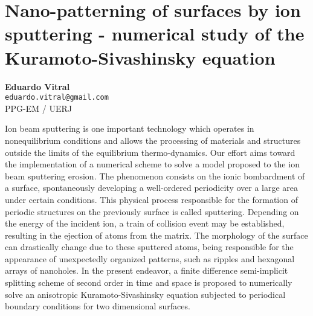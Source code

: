 
\section{Nano-patterning of surfaces by ion sputtering - numerical study of the Kuramoto-Sivashinsky equation}

\textbf{Eduardo Vitral}\\
\texttt{\small{eduardo.vitral@gmail.com}}\\
PPG-EM / UERJ

Ion beam sputtering is one important technology which operates in nonequilibrium conditions and allows the processing of materials and structures outside the limits of the equilibrium thermo-dynamics. Our effort aims toward the implementation of a numerical scheme to solve a model proposed to the ion beam sputtering erosion. The phenomenon consists on the ionic bombardment of a surface, spontaneously developing a well-ordered periodicity over a large area under certain conditions. This physical process responsible for the formation of periodic structures on the previously surface is called sputtering. Depending on the energy of the incident ion, a train of collision event may be established, resulting in the ejection of atoms from the matrix. The morphology of the surface can drastically change due to these sputtered atoms, being responsible for the appearance of unexpectedly organized patterns, such as ripples and hexagonal arrays of nanoholes. In the present endeavor, a finite difference semi-implicit splitting scheme of second order in time and space is proposed to numerically solve an anisotropic Kuramoto-Sivashinsky equation subjected to periodical boundary conditions for two dimensional surfaces.

